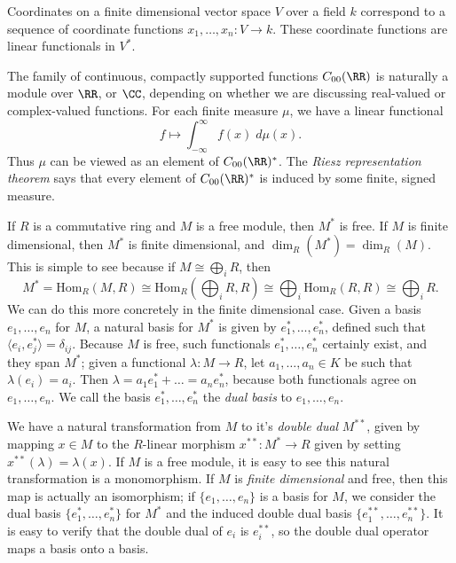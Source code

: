 \begin{example}
    Coordinates on a finite dimensional vector space $V$ over a field $k$ correspond to a sequence of coordinate functions $x_1, \dots, x_n: V \to k$. These coordinate functions are linear functionals in $V^*$.
\end{example}

\begin{example}
    The family of continuous, compactly supported functions $C_{00}(\RR)$ is naturally a module over $\RR$, or $\CC$, depending on whether we are discussing real-valued or complex-valued functions. For each finite measure $\mu$, we have a linear functional
    \[ f \mapsto \int_{-\infty}^\infty f(x)\; d\mu(x). \]
    Thus $\mu$ can be viewed as an element of $C_{00}(\RR)^*$. The \emph{Riesz representation theorem} says that every element of $C_{00}(\RR)^*$ is induced by some finite, signed measure.
\end{example}

If $R$ is a commutative ring and $M$ is a free module, then $M^*$ is free. If $M$ is finite dimensional, then $M^*$ is finite dimensional, and $\dim_R(M^*) = \dim_R(M)$. This is simple to see because if $M \cong \bigoplus_i R$, then
%
\[ M^* = \text{Hom}_R(M,R) \cong \text{Hom}_R \left( \bigoplus_i R, R \right) \cong \bigoplus_i \text{Hom}_R(R,R) \cong \bigoplus_i R. \]
%
We can do this more concretely in the finite dimensional case. Given a basis $e_1,\dots,e_n$ for $M$, a natural basis for $M^*$ is given by $e_1^*, \dots, e_n^*$, defined such that $\langle e_i, e_j^* \rangle = \delta_{ij}$. Because $M$ is free, such functionals $e_1^*, \dots, e_n^*$ certainly exist, and they span $M^*$; given a functional $\lambda: M \to R$, let $a_1, \dots, a_n \in K$ be such that $\lambda(e_i) = a_i$. Then $\lambda = a_1e_1^* + \dots = a_ne_n^*$, because both functionals agree on $e_1,\dots,e_n$. We call the basis $e_1^*, \dots, e_n^*$ the \emph{dual basis} to $e_1,\dots, e_n$.

We have a natural transformation from $M$ to it's \emph{double dual} $M^{**}$, given by mapping $x \in M$ to the $R$-linear morphism $x^{**}: M^* \to R$ given by setting $x^{**}(\lambda) = \lambda(x)$. If $M$ is a free module, it is easy to see this natural transformation is a monomorphism. If $M$ is \emph{finite dimensional} and free, then this map is actually an isomorphism; if $\{ e_1, \dots, e_n \}$ is a basis for $M$, we consider the dual basis $\{ e_1^*, \dots, e_n^* \}$ for $M^*$ and the induced double dual basis $\{ e_1^{**}, \dots, e_n^{**} \}$. It is easy to verify that the double dual of $e_i$ is $e_i^{**}$, so the double dual operator maps a basis onto a basis.

